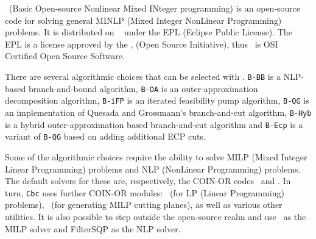

\Bonmin\ (Basic Open-source Nonlinear Mixed INteger programming)
is an open-source code for solving general MINLP (Mixed
Integer NonLinear Programming) problems.
 It is distributed on
\COINOR\ 
under the EPL (Eclipse Public
License). The EPL is a license approved by the
,
(Open Source Initiative),
 thus \Bonmin\ is OSI
Certified Open Source Software.

There are several algorithmic choices that can be selected with \Bonmin.
{\tt B-BB} is a NLP-based branch-and-bound algorithm,
{\tt B-OA} is an
outer-ap\-prox\-i\-ma\-tion decomposition algorithm, {\tt B-iFP} is an iterated
feasibility pump algorithm, {\tt B-QG} is an
implementation of  Quesada and Grossmann's branch-and-cut algorithm,
{\tt B-Hyb} is a hybrid outer-ap\-prox\-i\-ma\-tion based
branch-and-cut algorithm and {\tt B-Ecp} is a variant of {\tt B-QG} based
on adding additional ECP cuts.


Some of the algorithmic choices require the ability to solve MILP
(Mixed Integer Linear Programming) problems and NLP (NonLinear
Programming) problems. The default solvers for these are,
respectively, the COIN-OR codes \Cbc\ and \Ipopt. In turn,
{\tt Cbc} uses further COIN-OR modules: \Clp\ (for LP (Linear
Programming) problems), \Cgl\ (for generating MILP cutting
planes), as well as various other utilities. It is also possible to
step outside the open-source realm and use
\Cplex\ as the MILP solver and FilterSQP as the NLP solver. 


